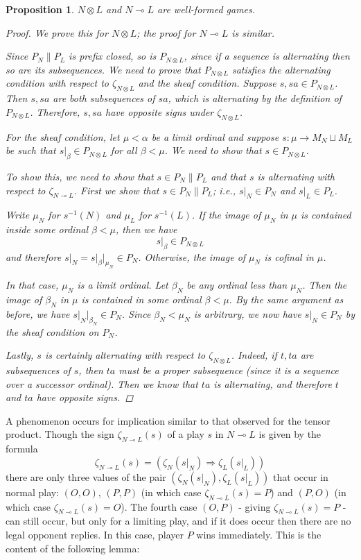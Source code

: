\documentclass[11pt]{article} %
\theoremstyle{plain} %
\newtheorem{proposition}[theorem]{Proposition}
\theoremstyle{definition} %
\theoremstyle{exercisestyle}
\newcommand*\from{\colon}
\newcommand{\cmap}[3]{#1\from{}#2\to{}#3}
\def \inv {^{-1}}
\newcommand{\tensor}{\otimes}
\renewcommand{\implies}{\multimap}
\newcommand{\cprd}{\sqcup}
\begin{document}
\begin{proposition}
$N\tensor L$ and $N\implies L$ are well-formed games.

\begin{proof}
  We prove this for $N\tensor L$; the proof for $N\implies L$ is similar.

  Since $P_N\|P_L$ is prefix closed, so is $P_{N\tensor L}$, since if a sequence is alternating then so are its subsequences.  We need to prove that $P_{N\tensor L}$ satisfies the alternating condition with respect to $\zeta_{N\tensor L}$ and the sheaf condition.  Suppose $s,sa\in P_{N\tensor L}$.  Then $s,sa$ are both subsequences of $sa$, which is alternating by the definition of $P_{N\tensor L}$.  Therefore, $s,sa$ have opposite signs under $\zeta_{N\tensor L}$.  

  For the sheaf condition, let $\mu<\alpha$ be a limit ordinal and suppose $\cmap{s}{\mu}{M_N\cprd M_L}$ be such that $s\vert_\beta\in P_{N\tensor L}$ for all $\beta<\mu$.  We need to show that $s\in P_{N\tensor L}$.  

  To show this, we need to show that $s\in P_N\|P_L$ and that $s$ is alternating with respect to $\zeta_{N\implies L}$.  First we show that $s\in P_N\|P_L$; i.e., $s\vert_N\in P_N$ and $s\vert_L\in P_L$.  
  
  Write $\mu_N$ for $s\inv(N)$ and $\mu_L$ for $s\inv(L)$.  If the image of $\mu_N$ in $\mu$ is contained inside some ordinal $\beta<\mu$, then we have
  \[
    s\vert_\beta\in P_{N\tensor L}
  \]
  and therefore $s\vert_N=s\vert_\beta\vert_{\mu_N}\in P_N$.  Otherwise, the image of $\mu_N$ is cofinal in $\mu$.  

  In that case, $\mu_N$ is a limit ordinal.  Let $\beta_N$ be any ordinal less than $\mu_N$.  Then the image of $\beta_N$ in $\mu$ is contained in some ordinal $\beta<\mu$.  By the same argument as before, we have $s\vert_N\vert_{\beta_N}\in P_N$.  Since $\beta_N<\mu_N$ is arbitrary, we now have $s\vert_N\in P_N$ by the sheaf condition on $P_N$.

  Lastly, $s$ is certainly alternating with respect to $\zeta_{N\tensor L}$.  Indeed, if $t,ta$ are subsequences of $s$, then $ta$ must be a \emph{proper} subsequence (since it is a sequence over a successor ordinal).  Then we know that $ta$ is alternating, and therefore $t$ and $ta$ have opposite signs.
\end{proof}
\end{proposition}

A phenomenon occurs for implication similar to that observed for the tensor product.  Though the sign $\zeta_{N\implies L}(s)$ of a play $s$ in $N\implies L$ is given by the formula
\[
  \zeta_{N\implies L}(s)=(\zeta_N(s\vert_N)\Rightarrow\zeta_L(s\vert_L))
\]
there are only three values of the pair $(\zeta_N(s\vert_N),\zeta_L(s\vert_L))$ that occur in normal play: $(O,O)$, $(P,P)$ (in which case $\zeta_{N\implies L}(s)=P$) and $(P,O)$ (in which case $\zeta_{N\implies L}(s)=O$).  The fourth case $(O,P)$ - giving $\zeta_{N\implies L}(s)=P$ - can still occur, but only for a limiting play, and if it does occur then there are no legal opponent replies.  In this case, player $P$ wins immediately.  This is the content of the following lemma:
\end{document}
